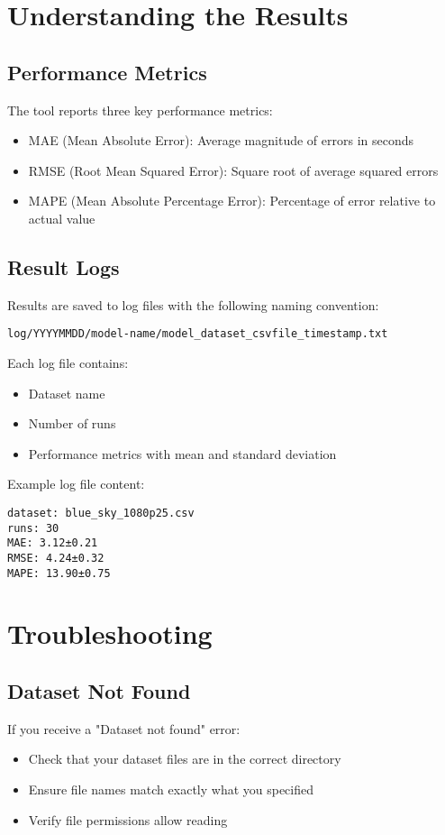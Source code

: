 \documentclass[10pt]{article}
\begin{document}
\section{Understanding the Results}

\subsection{Performance Metrics}
The tool reports three key performance metrics:
\begin{itemize}
    \item MAE (Mean Absolute Error): Average magnitude of errors in seconds
    \item RMSE (Root Mean Squared Error): Square root of average squared errors
    \item MAPE (Mean Absolute Percentage Error): Percentage of error relative to actual value
\end{itemize}

\subsection{Result Logs}
Results are saved to log files with the following naming convention:
\begin{lstlisting}
log/YYYYMMDD/model-name/model_dataset_csvfile_timestamp.txt
\end{lstlisting}

Each log file contains:
\begin{itemize}
    \item Dataset name
    \item Number of runs
    \item Performance metrics with mean and standard deviation
\end{itemize}

Example log file content:
\begin{lstlisting}
dataset: blue_sky_1080p25.csv
runs: 30
MAE: 3.12±0.21
RMSE: 4.24±0.32
MAPE: 13.90±0.75
\end{lstlisting}

\section{Troubleshooting}

\subsection{Dataset Not Found}
If you receive a "Dataset not found" error:
\begin{itemize}
    \item Check that your dataset files are in the correct directory
    \item Ensure file names match exactly what you specified
    \item Verify file permissions allow reading
\end{itemize}
\end{document}
